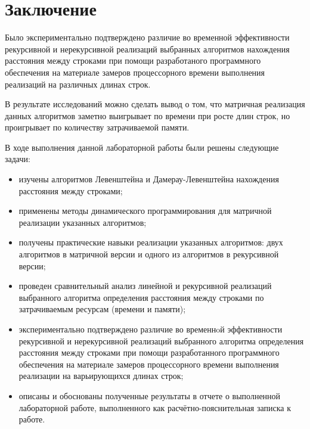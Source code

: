 \documentclass[a4paper,14pt, unknownkeysallowed]{extreport}
\begin{document}
 

\chapter*{Заключение}

Было экспериментально подтверждено различие во временной эффективности рекурсивной и нерекурсивной реализаций выбранных алгоритмов нахождения расстояния между строками при помощи разработаного программного обеспечения на материале замеров процессорного времени выполнения реализаций на различных длинах строк. 

В результате исследований можно сделать вывод о том, что матричная реализация данных алгоритмов заметно выигрывает по времени при росте длин строк, но проигрывает по количеству затрачиваемой памяти.

\vspace{5mm}

В ходе выполнения данной лабораторной работы были решены следующие задачи:
\begin{itemize}
	\item изучены алгоритмов Левенштейна и Дамерау-Левенштейна нахождения расстояния между строками;
	\item применены методы динамического программирования для матричной реализации указанных алгоритмов;
	\item получены практические навыки реализации указанных алгоритмов: двух алгоритмов в матричной версии и одного из алгоритмов в рекурсивной версии;
	\item проведен сравнительный анализ линейной и рекурсивной реализаций выбранного алгоритма определения расстояния между строками по затрачиваемым ресурсам (времени и памяти);
	\item экспериментально подтверждено различие во временнoй эффективности рекурсивной и нерекурсивной реализаций выбранного алгоритма определения расстояния между строками при помощи разработанного программного обеспечения на материале замеров процессорного времени выполнения реализации на варьирующихся длинах строк;
	\item описаны и обоснованы полученные результаты в отчете о выполненной лабораторной работе, выполненного как расчётно-пояснительная записка к работе.
\end{itemize}
\end{document}
